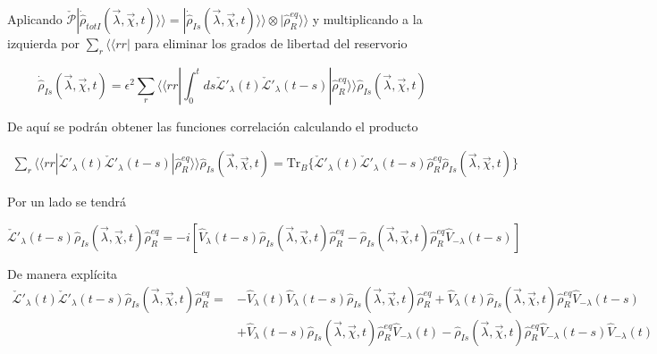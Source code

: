 \begin{appendixs}
Aplicando $\check{\mathcal{P}}|\dot{\hat{\rho}}_{totI}(\vec{\lambda},\vec{\chi},t)\rangle \rangle = |\dot{\hat{\rho}}_{Is}(\vec{\lambda},\vec{\chi},t)\rangle \rangle \otimes |\hat{\rho}^{eq}_{R}\rangle \rangle$ y multiplicando a la izquierda por $\sum_{r}\langle \langle rr|$ para eliminar los grados de libertad del reservorio

\begin{equation*}
    \dot{\hat{\rho}}_{Is}(\vec{\lambda},\vec{\chi},t) = \epsilon^{2} \sum_{r}\langle \langle rr|\int_{0}^{t}ds \check{\mathcal{L}}'_{\lambda}(t)\check{\mathcal{L}}'_{\lambda}(t-s)|\hat{\rho}_{R}^{eq}\rangle \rangle \hat{\rho}_{Is}(\vec{\lambda},\vec{\chi},t)
\end{equation*}

De aquí se podrán obtener las funciones correlación calculando el producto

\begin{align*}
    \sum_{r}\langle \langle rr| \check{\mathcal{L}}'_{\lambda}(t)\check{\mathcal{L}}'_{\lambda}(t-s)|\hat{\rho}_{R}^{eq}\rangle \rangle \hat{\rho}_{Is}(\vec{\lambda},\vec{\chi},t) = \text{Tr}_{B}\{\check{\mathcal{L}}'_{\lambda}(t)\check{\mathcal{L}}'_{\lambda}(t-s)\hat{\rho}_{R}^{eq}\hat{\rho}_{Is}(\vec{\lambda},\vec{\chi},t) \}
\end{align*}

Por un lado se tendrá

\begin{equation*}
    \check{\mathcal{L}}'_{\lambda}(t-s)\hat{\rho}_{Is}(\vec{\lambda},\vec{\chi},t)\hat{\rho}_{R}^{eq} = -i[\hat{V}_{\lambda}(t-s)\hat{\rho}_{Is}(\vec{\lambda},\vec{\chi},t)\hat{\rho}^{eq}_{R} -  \hat{\rho}_{Is}(\vec{\lambda},\vec{\chi},t)\hat{\rho}^{eq}_{R}\hat{V}_{-\lambda}(t-s)]
\end{equation*}

De manera explícita
\begin{align*}
    \check{\mathcal{L}}'_{\lambda}(t)\check{\mathcal{L}}'_{\lambda}(t-s)\hat{\rho}_{Is}(\vec{\lambda},\vec{\chi},t)\hat{\rho}_{R}^{eq}  = &  -\hat{V}_{\lambda}(t)\hat{V}_{\lambda}(t-s)\hat{\rho}_{Is}(\vec{\lambda},\vec{\chi},t)\hat{\rho}_{R}^{eq} + \hat{V}_{\lambda}(t)\hat{\rho}_{Is}(\vec{\lambda},\vec{\chi},t)\hat{\rho}_{R}^{eq}\hat{V}_{-\lambda}(t-s) \\
    & + \hat{V}_{\lambda}(t-s)\hat{\rho}_{Is}(\vec{\lambda},\vec{\chi},t)\hat{\rho}_{R}^{eq}\hat{V}_{-\lambda}(t) - \hat{\rho}_{Is}(\vec{\lambda},\vec{\chi},t)\hat{\rho}_{R}^{eq}\hat{V}_{-\lambda}(t-s)\hat{V}_{-\lambda}(t)
\end{align*}


\end{appendixs}
